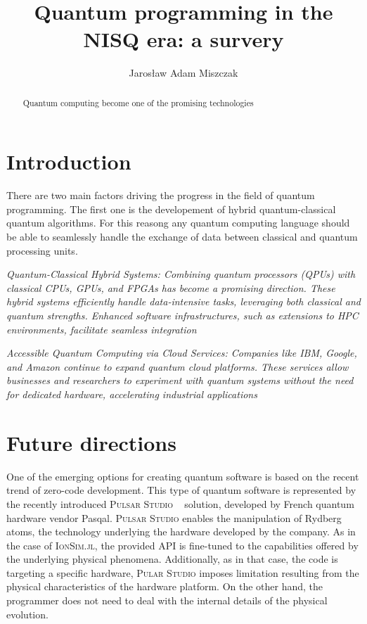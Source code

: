\documentclass[10pt,a4paper]{article}
\title{Quantum programming in the NISQ era: a survery}
\author{Jarosław Adam Miszczak}
\newcommand{\pkg}[1]{\textsc{#1}}
\begin{document}
	\maketitle
	
	
	\begin{abstract}
		Quantum computing become one of the promising technologies
	\end{abstract}


	
\section{Introduction}

There are two main factors driving the progress in the field of quantum programming. The first one is the developement of hybrid quantum-classical quantum algorithms. For this reasong any quantum computing language should be able to seamlessly handle the exchange of data between classical and quantum processing units.

\emph{Quantum-Classical Hybrid Systems: Combining quantum processors (QPUs) with classical CPUs, GPUs, and FPGAs has become a promising direction. These hybrid systems efficiently handle data-intensive tasks, leveraging both classical and quantum strengths. Enhanced software infrastructures, such as extensions to HPC environments, facilitate seamless integration}


\emph{Accessible Quantum Computing via Cloud Services: Companies like IBM, Google, and Amazon continue to expand quantum cloud platforms. These services allow businesses and researchers to experiment with quantum systems without the need for dedicated hardware, accelerating industrial applications}


\section{Future directions}


One of the emerging options for creating quantum software is based on the recent trend of zero-code development. This type of quantum software is represented by the recently introduced \pkg{Pulsar Studio} ~\cite{pulsar-studio,pasqal-pulsar-s-1} solution, developed by French quantum hardware vendor Pasqal. \pkg{Pulsar Studio} enables the manipulation of Rydberg atoms, the technology underlying the hardware developed by the company. As in the case of \pkg{IonSim.jl}, the provided API is fine-tuned to the capabilities offered by the underlying physical phenomena. Additionally, as in that case, the code is targeting a specific hardware, \pkg{Pular Studio} imposes limitation resulting from the physical characteristics of the hardware platform. On the other hand, the programmer does not need to deal with the internal details of the physical evolution.



\nocite{*}

	
\end{document}
